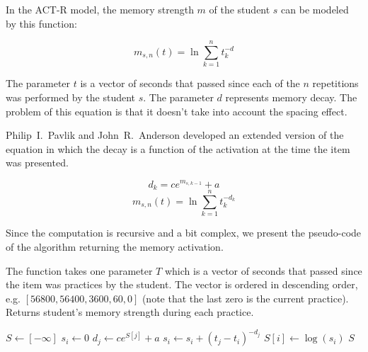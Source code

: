 In the ACT-R model, the memory strength $m$ of the student $s$ can be modeled by this function:

\begin{equation} \label{eq-actr}
  m_{s,n}(t) = \ln{\sum_{k=1}^{n} t_{k}^{-d}}
\end{equation}

The parameter $t$ is a vector of seconds that passed since each of the $n$ repetitions was performed by the student $s$. The parameter $d$ represents memory decay. The problem of this equation is that it doesn't take into account the spacing effect.

Philip~I.~Pavlik and John~R.~Anderson developed an extended version of the equation in which the decay is a function of the activation at the time the item was presented.

\begin{equation} \label{eq-pavlik-decay}
  d_k = ce^{m_{s,k-1}} + a
\end{equation}
\begin{equation} \label{eq-pavlik-activation}
  m_{s,n}(t) = \ln{\sum_{k=1}^{n} t_{k}^{-d_k}}
\end{equation}

Since the computation is recursive and a bit complex, we present the pseudo-code of the algorithm returning the memory activation.

\begin{algorithm}
  \caption{The function takes one parameter $T$ which is a vector of seconds that passed since the item was practices by the student. The vector is ordered in descending order, e.g. $[56800, 56400, 3600, 60, 0]$ (note that the last zero is the current practice). Returns student's memory strength during each practice.}
  \begin{algorithmic}[1]
      \State $S \gets [-\infty]$
        \State $s_i \gets 0$
          \State $d_j \gets ce^{S[j]} + a$
          \State $s_i \gets s_i + (t_j - t_i)^{-d_j}$
        \EndFor
        \State $S[i] \gets \log(s_i)$
      \EndFor
      \State \Return $S$
    \EndFunction
  \end{algorithmic}
\end{algorithm}
